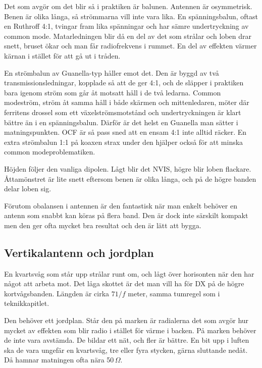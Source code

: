 Det som avgör om det blir så i praktiken är balunen. Antennen är
osymmetrisk. Benen är olika långa, så strömmarna vill inte vara lika.
En spänningsbalun, oftast en Ruthroff 4:1, tvingar fram lika
spänningar och har sämre undertryckning av common mode. Matarledningen
blir då en del av det som strålar och loben drar snett, bruset ökar
och man får radiofrekvens i rummet. En del av effekten värmer kärnan i
stället för att gå ut i tråden.

En strömbalun av Guanella-typ håller emot det. Den är byggd av två
transmissionsledningar, kopplade så att de ger 4:1, och de släpper i
praktiken bara igenom ström som går åt motsatt håll i de två
ledarna. Common modeström, ström åt samma håll i både skärmen och
mittenledaren, möter där ferritens drossel som ett växelströmsmotstånd
och undertryckningen är klart bättre än i en spänningsbalun. Därför är
det helst en Guanella man sätter i matningspunkten. OCF är så pass
sned att en ensam 4:1 inte alltid räcker. En extra strömbalun 1:1 på
koaxen strax under den hjälper också för att minska common
modeproblematiken.

Höjden följer den vanliga dipolen. Lågt blir det NVIS, högre blir
loben flackare. Åttamönstret är lite snett eftersom benen är olika
långa, och på de högre banden delar loben sig.

Förutom obalansen i antennen är den fantastisk när man enkelt behöver
en antenn som snabbt kan köras på flera band. Den är dock inte
särskilt kompakt men den ger ofta mycket bra resultat och den är lätt
att bygga.

\subsection{Vertikalantenn och jordplan}

En kvartsvåg som står upp strålar runt om, och lågt över horisonten
när den har något att arbeta mot. Det låga skottet är det man vill ha
för DX på de högre kortvågsbanden. Längden är cirka $71/f$ meter,
samma tumregel som i teknikkapitlet.

Den behöver ett jordplan. Står den på marken är radialerna det som
avgör hur mycket av effekten som blir radio i stället för värme i
backen. På marken behöver de inte vara avstämda. De bildar ett nät,
och fler är bättre. En bit upp i luften ska de vara ungefär en
kvartsvåg, tre eller fyra stycken, gärna sluttande nedåt. Då hamnar
matningen ofta nära 50\,$\Omega$.

